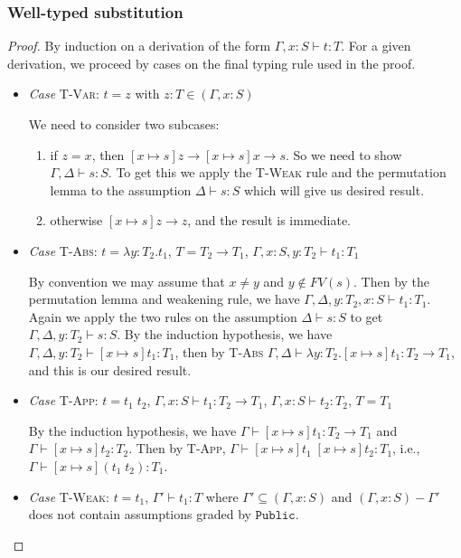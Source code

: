 \documentclass[conference]{IEEEtran}
\newcommand\lam[2]{\lambda #1.#2}
\newcommand\public{\texttt{Public}}
\begin{document}
\subsubsection{Well-typed substitution}
\begin{proof}
	By induction on a derivation of the form $\Gamma,x:S\vdash t:T$. For a given derivation, we proceed by cases on the final typing rule used in the proof.
	\begin{itemize}		
		\item\textit{Case} \textsc{T-Var}: $t=z$ with $z:T\in(\Gamma,x:S)$
		
		We need to consider two subcases: 
		\begin{enumerate}
			\item if $z=x$, then $[x\mapsto s]z\to[x\mapsto s]x\to s$. So we need to show $\Gamma,\Delta\vdash s:S$. To get this we apply the \textsc{T-Weak} rule and the permutation lemma to the assumption $\Delta\vdash s:S$ which will give us desired result.
			\item otherwise $[x\mapsto s]z\to z$, and the result is immediate.
		\end{enumerate}	
		
		\item\textit{Case} \textsc{T-Abs}: $t=\lam{y:T_2}{t_1}$, $T=T_2\to T_1$, $\Gamma,x:S,y:T_2\vdash t_1:T_1$
		
		By convention we may assume that $x\ne y$ and $y\notin FV(s)$. Then by the permutation lemma and weakening rule, we have $\Gamma,\Delta,y:T_2,x:S\vdash t_1:T_1$. Again we apply the two rules on the assumption $\Delta\vdash s:S$ to get $\Gamma,\Delta,y:T_2\vdash s:S$. By the induction hypothesis, we have $\Gamma,\Delta,y:T_2\vdash [x\mapsto s]t_1:T_1$, then by \textsc{T-Abs} $\Gamma,\Delta\vdash \lam{y:T_2}{[x\mapsto s]t_1}:T_2\to T_1$, and this is our desired result.
		
		\item\textit{Case} \textsc{T-App}: $t=t_1\; t_2$, $\Gamma,x:S\vdash t_1:T_2\to T_1$, $\Gamma,x:S\vdash t_2:T_2$, $T=T_1$
		
		By the induction hypothesis, we have $\Gamma\vdash [x\mapsto s]t_1:T_2\to T_1$ and $\Gamma\vdash [x\mapsto s]t_2:T_2$. Then by \textsc{T-App}, $\Gamma\vdash [x\mapsto s]t_1\; [x\mapsto s]t_2:T_1$, i.e., $\Gamma\vdash [x\mapsto s](t_1\; t_2):T_1$.
		
		\item\textit{Case} \textsc{T-Weak}: $t=t_1$, $\Gamma'\vdash t_1:T$ where $\Gamma'\subseteq(\Gamma,x:S)$ and $(\Gamma,x:S)-\Gamma'$ does not contain assumptions graded by $\public$.
		

\end{itemize}
\end{proof}
\end{document}
